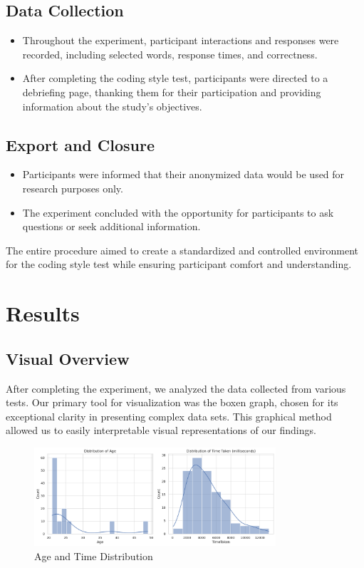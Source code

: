 \documentclass{article}
\begin{document}
\subsection*{Data Collection}

\begin{itemize}
  \item Throughout the experiment, participant interactions and responses were recorded, including selected words, response times, and correctness.
  \item After completing the coding style test, participants were directed to a debriefing page, thanking them for their participation and providing information about the study's objectives.
\end{itemize}

\subsection*{Export and Closure}

\begin{itemize}
  \item Participants were informed that their anonymized data would be used for research purposes only.
  \item The experiment concluded with the opportunity for participants to ask questions or seek additional information.
\end{itemize}

The entire procedure aimed to create a standardized and controlled environment for the coding style test while ensuring participant comfort and understanding.


\section{Results}
\subsection{Visual Overview}

After completing the experiment, we analyzed the data collected from various tests. Our primary tool for visualization was the boxen graph, chosen for its exceptional clarity in presenting complex data sets. This graphical method allowed us to easily interpretable visual representations of our findings.

\begin{figure}[H]
    \centering
    \includegraphics[width=0.8\textwidth]{distribution_age.png}
    \caption{Age and Time Distribution}
\end{figure}
\end{document}
